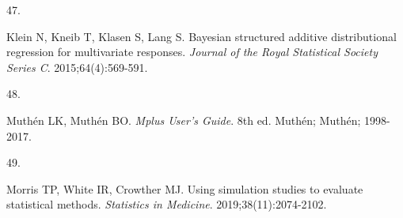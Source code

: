 \documentclass[
  11pt,
]{article}
\newlength{\cslhangindent}
\newlength{\csllabelwidth}
\newenvironment{CSLReferences}[2] %
 {\begin{list}{}{%
  \setlength{\itemindent}{0pt}
  \setlength{\leftmargin}{0pt}
  \setlength{\parsep}{0pt}
  \ifodd #1
   \setlength{\leftmargin}{\cslhangindent}
   \setlength{\itemindent}{-1\cslhangindent}
  \fi
  \setlength{\itemsep}{#2\baselineskip}}}
 {\end{list}}
\newcommand{\CSLLeftMargin}[1]{\parbox[t]{\csllabelwidth}{\strut#1\strut}}
\newcommand{\CSLRightInline}[1]{\parbox[t]{\linewidth - \csllabelwidth}{\strut#1\strut}}
\begin{document}
\begin{CSLReferences}{0}{1}
\CSLLeftMargin{47. }%
\CSLRightInline{Klein N, Kneib T, Klasen S, Lang S. {B}ayesian structured additive distributional regression for multivariate responses. \emph{Journal of the Royal Statistical Society Series C}. 2015;64(4):569-591.}

\CSLLeftMargin{48. }%
\CSLRightInline{Muthén LK, Muthén BO. \emph{{M}plus User's Guide}. 8th ed. Muth{é}n; Muth{é}n; 1998-2017.}

\CSLLeftMargin{49. }%
\CSLRightInline{Morris TP, White IR, Crowther MJ. Using simulation studies to evaluate statistical methods. \emph{Statistics in Medicine}. 2019;38(11):2074-2102.}

\end{CSLReferences}
\end{document}
